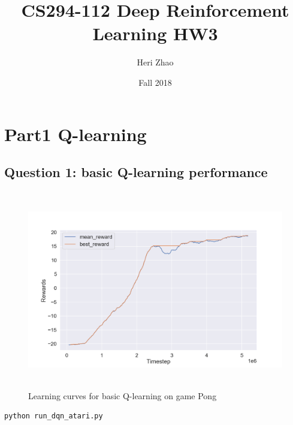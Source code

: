 \documentclass[12pt]{article}
\title{CS294-112 Deep Reinforcement Learning HW3}
\author{ Heri Zhao
}
\date{Fall 2018}
\begin{document}
\maketitle

\section*{Part1 Q-learning}

\subsection*{Question 1: basic Q-learning performance}
\begin{figure}[H]
  \centering
  \includegraphics[height=3.4in]{part1_q1.png}
  \caption{Learning curves for basic Q-learning on game Pong}
\end{figure}
\begin{lstlisting}[language=bash]
python run_dqn_atari.py
\end{lstlisting}
\end{document}
